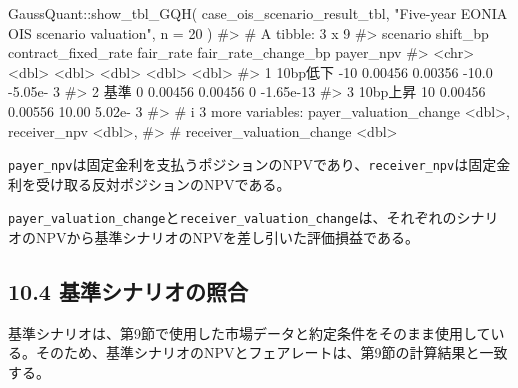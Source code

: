 \documentclass[
  letterpaper,
  DIV=11,
  numbers=noendperiod]{scrreprt}
\newenvironment{Shaded}{\begin{snugshade}}{\end{snugshade}}
\newcommand{\AttributeTok}[1]{\textcolor[rgb]{0.40,0.45,0.13}{#1}}
\newcommand{\CommentTok}[1]{\textcolor[rgb]{0.37,0.37,0.37}{#1}}
\newcommand{\DecValTok}[1]{\textcolor[rgb]{0.68,0.00,0.00}{#1}}
\newcommand{\FunctionTok}[1]{\textcolor[rgb]{0.28,0.35,0.67}{#1}}
\newcommand{\NormalTok}[1]{\textcolor[rgb]{0.00,0.23,0.31}{#1}}
\newcommand{\SpecialCharTok}[1]{\textcolor[rgb]{0.37,0.37,0.37}{#1}}
\newcommand{\StringTok}[1]{\textcolor[rgb]{0.13,0.47,0.30}{#1}}
\begin{document}
\begin{Shaded}
\begin{Highlighting}[]
\NormalTok{GaussQuant}\SpecialCharTok{::}\FunctionTok{show\_tbl\_GQH}\NormalTok{(}
\NormalTok{  case\_ois\_scenario\_result\_tbl,}
  \StringTok{"Five{-}year EONIA OIS scenario valuation"}\NormalTok{,}
  \AttributeTok{n =} \DecValTok{20}
\NormalTok{)}
\CommentTok{\#\textgreater{} \# A tibble: 3 x 9}
\CommentTok{\#\textgreater{}   scenario shift\_bp contract\_fixed\_rate fair\_rate fair\_rate\_change\_bp payer\_npv}
\CommentTok{\#\textgreater{}   \textless{}chr\textgreater{}       \textless{}dbl\textgreater{}               \textless{}dbl\textgreater{}     \textless{}dbl\textgreater{}               \textless{}dbl\textgreater{}     \textless{}dbl\textgreater{}}
\CommentTok{\#\textgreater{} 1 10bp低下      {-}10             0.00456   0.00356              {-}10.0  {-}5.05e{-} 3}
\CommentTok{\#\textgreater{} 2 基準            0             0.00456   0.00456                0    {-}1.65e{-}13}
\CommentTok{\#\textgreater{} 3 10bp上昇       10             0.00456   0.00556               10.00  5.02e{-} 3}
\CommentTok{\#\textgreater{} \# i 3 more variables: payer\_valuation\_change \textless{}dbl\textgreater{}, receiver\_npv \textless{}dbl\textgreater{},}
\CommentTok{\#\textgreater{} \#   receiver\_valuation\_change \textless{}dbl\textgreater{}}
\end{Highlighting}
\end{Shaded}

\texttt{payer\_npv}は固定金利を支払うポジションのNPVであり、\texttt{receiver\_npv}は固定金利を受け取る反対ポジションのNPVである。

\texttt{payer\_valuation\_change}と\texttt{receiver\_valuation\_change}は、それぞれのシナリオのNPVから基準シナリオのNPVを差し引いた評価損益である。

\subsection{10.4
基準シナリオの照合}\label{ux57faux6e96ux30b7ux30caux30eaux30aaux306eux7167ux5408}

基準シナリオは、第9節で使用した市場データと約定条件をそのまま使用している。そのため、基準シナリオのNPVとフェアレートは、第9節の計算結果と一致する。
\end{document}
